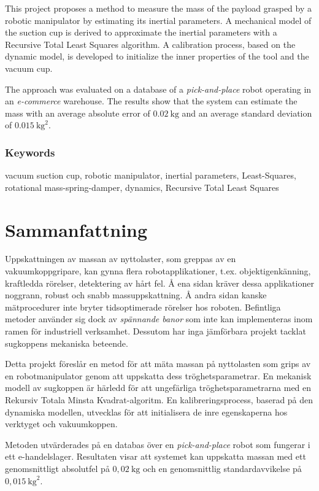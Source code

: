 \documentclass[/home/francois/latex/report/main.tex]{subfiles}
\begin{document}
This project proposes a method to measure the mass of the payload grasped by a robotic manipulator by estimating its inertial parameters. A mechanical model of the suction cup is derived to approximate the inertial parameters with a Recursive Total Least Squares algorithm. A calibration process, based on the dynamic model, is developed to initialize the inner properties of the tool and the vacuum cup.

The approach was evaluated on a database of a \textit{pick-and-place} robot operating in an \textit{e-commerce} warehouse. The results show that the system can estimate the mass with an average absolute error of $0.02 \ \si{\kilogram}$ and an average standard deviation of $0.015 \ \si{\kilogram\squared}$.

\subsection*{Keywords}

vacuum suction cup, robotic manipulator, inertial parameters, Least-Squares, rotational mass-spring-damper, dynamics, Recursive Total Least Squares

\newpage
\thispagestyle{plain}

\chapter*{Sammanfattning}

Uppskattningen av massan av nyttolaster, som greppas av en vakuumkoppgripare, kan gynna flera robotapplikationer, t.ex. objektigenkänning, kraftledda rörelser, detektering av hårt fel. Å ena sidan kräver dessa applikationer noggrann, robust och snabb massuppskattning. Å andra sidan kanske mätprocedurer inte bryter tidsoptimerade rörelser hos roboten. Befintliga metoder använder sig dock av \textit{spännande banor} som inte kan implementeras inom ramen för industriell verksamhet. Dessutom har inga jämförbara projekt tacklat sugkoppens mekaniska beteende.

Detta projekt föreslår en metod för att mäta massan på nyttolasten som grips av en robotmanipulator genom att uppskatta dess tröghetsparametrar. En mekanisk modell av sugkoppen är härledd för att ungefärliga tröghetsparametrarna med en Rekursiv Totala Minsta Kvadrat-algoritm. En kalibreringsprocess, baserad på den dynamiska modellen, utvecklas för att initialisera de inre egenskaperna hos verktyget och vakuumkoppen.

Metoden utvärderades på en databas över en \textit{pick-and-place} robot som fungerar i ett e-handelslager. Resultaten visar att systemet kan uppskatta massan med ett genomsnittligt absolutfel på $0{,}02 \ \si{\kilogram}$ och en genomsnittlig standardavvikelse på $0{,}015 \ \si{\kilogram\squared}$.
\end{document}
